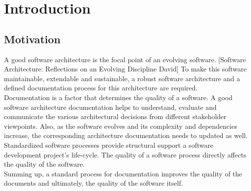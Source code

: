 \chapter{Introduction}\label{chapter:Introduction}

\section{Motivation}\label{sec:motiv}
\indent A good software architecture is the focal point of an evolving software. [Software Architecture: Reflections on an Evolving Discipline
David] To make this software maintainable, extendable and sustainable, a robust software architecture and a defined documentation process for this architecture are required.
\\\indent Documentation is a factor that determines the quality of a software. A good software architecture documentation helps to understand, evaluate and communicate the various architectural decisions from different stakeholder viewpoints. Also, as the software evolves and its complexity and dependencies increase, the corresponding architecture documentation needs to updated as well.
\\\indent Standardized software processes provide structural support a software development project's life-cycle. The quality of a software process directly affects the quality of the software.
\\\indent Summing up, a standard process for documentation improves the quality of the documents and ultimately, the quality of the software itself.

